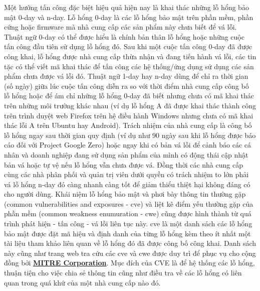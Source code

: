Một hướng tấn công đặc biệt hiệu quả hiện nay là khai thác những lỗ hổng bảo mật 0-day và n-day. Lỗ hổng 0-day là các lỗ hổng bảo mật trên phần mềm, phần cứng hoặc firmware mà nhà cung cấp các sản phẩm này chưa biết để vá lỗi. Thuật ngữ 0-day có thể được hiểu là chính bản thân lỗ hổng hoặc những cuộc tấn công đầu tiên sử dụng lỗ hổng đó. Sau khi một cuộc tấn công 0-day đã được công khai, lỗ hổng được nhà cung cấp thừa nhận và đang tiến hành vá lỗi, các tin tặc có thể viết mã khai thác để tấn công các hệ thống/ứng dụng sử dụng các sản phẩm chưa được vá lỗi đó. Thuật ngữ 1-day hay n-day dùng để chỉ ra thời gian (số ngày) giữa lúc cuộc tấn công diễn ra so với thời điểm nhà cung cấp công bố lỗ hổng hoặc để ám chỉ những lỗ hổng 0-day đã biết nhưng chưa có mã khai thác trên những môi trường khác nhau (ví dụ lỗ hổng A đã được khai thác thành công trên trình duyệt web Firefox trên hệ điều hành Windows nhưng chưa có mã khai thác lỗi A trên Ubuntu hay Android). Trách nhiệm của nhà cung cấp là công bố lỗ hổng ngay sau thời gian quy định (ví dụ như 90 ngày sau khi lỗ hổng được báo cáo đối với Project Google Zero) hoặc ngay khi có bản vá lỗi để cảnh báo các cá nhân và doanh nghiệp đang sử dụng sản phẩm của mình có động thái cập nhật bản vá hoặc tự vệ nếu lỗ hổng vẫn chưa được vá. Đồng thời các nhà cung cấp cùng các nhà phân phối và quản trị viên dưới quyền có trách nhiệm to lớn phải vá lỗ hổng n-day đó càng nhanh càng tốt để giảm thiểu thiệt hại không đáng có cho người dùng. Khái niệm lỗ hổng bảo mật và phơi bày thông tin thường gặp (common vulnerabilities and exposures - \acrshort{cve}) và liệt kê điểm yếu thường gặp của phần mềm (common weakness enumuration - \acrshort{cwe}) cũng được hình thành từ quá trình phát hiện - tấn công - vá lỗi liên tục này. \acrshort{cve} là một danh sách các lỗ hổng bảo mật được đặt mã hiệu và định danh của từng lỗ hổng kèm theo ít nhất một tài liệu tham khảo liên quan về lỗ hổng đó đã được công bố công khai. Danh sách này cũng như trang web tra cứu các \acrshort{cve} \parencite{CVE-details} và \acrshort{cwe} \parencite{CWE-details} được duy trì để phục vụ cho cộng đồng bởi \href{http://cve.mitre.org/}{\textbf{MITRE Corporation}}. Mục đích của CVE là để hệ thống các lỗ hổng, thuận tiện cho việc chia sẻ thông tin cũng như điều tra về các lỗ hổng có liên quan trong quá khứ của một nhà cung cấp nào đó. \par
